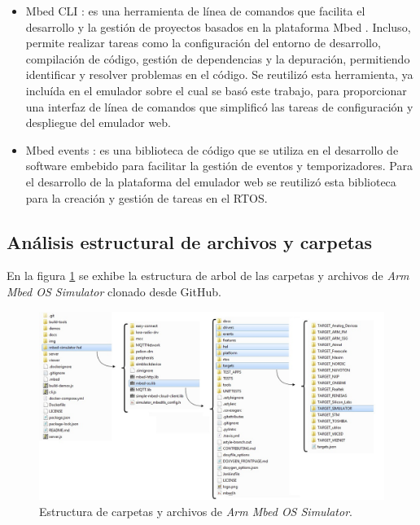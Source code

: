 \begin{itemize}
    \item Mbed CLI \citep{MbedCLI}: es una herramienta de línea de comandos que facilita el desarrollo y la gestión de proyectos basados en la plataforma Mbed \citep{ArmMbed}. Incluso, permite realizar tareas como la configuración del entorno de desarrollo, compilación de código, gestión de dependencias y la depuración, permitiendo identificar y resolver problemas en el código. Se reutilizó esta herramienta, ya incluída en el emulador sobre el cual se basó este trabajo, para proporcionar una interfaz de línea de comandos que simplificó las tareas de configuración y despliegue del emulador web.
 
    
     \item Mbed events \citep{ArmMbed}: es una biblioteca de código que se utiliza en el desarrollo de software embebido para facilitar la gestión de eventos y temporizadores. Para el desarrollo de la plataforma del emulador web se reutilizó esta biblioteca para la creación y gestión de tareas en el RTOS.
     
\end{itemize}

\subsection{Análisis estructural de archivos y carpetas}


En la figura \ref{fig:estructuraMbed1} se exhibe la estructura de arbol de las carpetas y archivos de \textit{Arm Mbed OS Simulator} clonado desde GitHub.


\hfill \break


\begin{figure}[ht]
	\centering
	\includegraphics[scale=.37]{./Figures/estructuraMbed.jpg}
	\caption{Estructura de carpetas y archivos de \textit{Arm Mbed OS Simulator}.}
	\label{fig:estructuraMbed1}
\end{figure}
 

